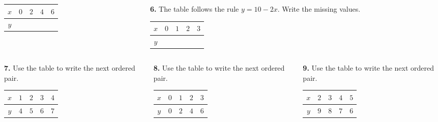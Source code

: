 \documentclass[aspectratio=169,12pt]{beamer}
\newcommand{\MMProblem}[2]{\begin{MMProblemCard}\raggedright\small\textbf{#1.} #2\par\end{MMProblemCard}}
\begin{document}
\begin{frame}[t]
\begin{columns}[T,onlytextwidth]
\begin{column}{0.32\textwidth}
{\begin{tabular}{|c|c|c|c|c|}
\hline
$x$ & $0$ & $2$ & $4$ & $6$ \\\hline
$y$ &  &  &  &  \\\hline
\end{tabular}}\end{column}
\begin{column}{0.32\textwidth}\MMProblem{6}{The table follows the rule \mbox{$y=10-2x$}. Write the missing values.\\[0.3em]
\begin{tabular}{|c|c|c|c|c|}
\hline
$x$ & $0$ & $1$ & $2$ & $3$ \\\hline
$y$ &  &  &  &  \\\hline
\end{tabular}}\end{column}
\end{columns}
\vspace{0.45em}
\begin{columns}[T,onlytextwidth]
\begin{column}{0.32\textwidth}\MMProblem{7}{Use the table to write the next ordered pair.\\[0.3em]
\begin{tabular}{|c|c|c|c|c|}
\hline
$x$ & $1$ & $2$ & $3$ & $4$ \\\hline
$y$ & $4$ & $5$ & $6$ & $7$ \\\hline
\end{tabular}}\end{column}
\begin{column}{0.32\textwidth}\MMProblem{8}{Use the table to write the next ordered pair.\\[0.3em]
\begin{tabular}{|c|c|c|c|c|}
\hline
$x$ & $0$ & $1$ & $2$ & $3$ \\\hline
$y$ & $0$ & $2$ & $4$ & $6$ \\\hline
\end{tabular}}\end{column}
\begin{column}{0.32\textwidth}\MMProblem{9}{Use the table to write the next ordered pair.\\[0.3em]
\begin{tabular}{|c|c|c|c|c|}
\hline
$x$ & $2$ & $3$ & $4$ & $5$ \\\hline
$y$ & $9$ & $8$ & $7$ & $6$ \\\hline
\end{tabular}}\end{column}
\end{columns}
\end{frame}
\end{document}
